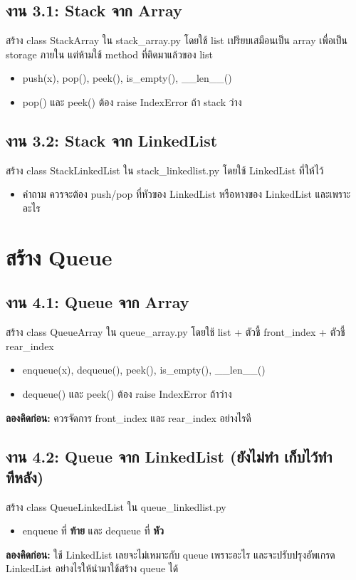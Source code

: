 \documentclass[12pt,a4paper]{article}
\begin{document}
	\subsection*{งาน 3.1: Stack จาก Array}
	สร้าง class {StackArray} ใน {stack\_array.py} โดยใช้ {list} เปรียบเสมือนเป็น array เพื่อเป็น storage ภายใน แต่ห้ามใช้ method ที่ติดมาแล้วของ list
	\begin{itemize}
		\item {push(x)}, {pop()}, {peek()}, {is\_empty()}, {\_\_len\_\_()}
		\item {pop()} และ {peek()} ต้อง raise {IndexError} ถ้า stack ว่าง
	\end{itemize}
	
	\subsection*{งาน 3.2: Stack จาก LinkedList}
	สร้าง class {StackLinkedList} ใน {stack\_linkedlist.py} โดยใช้ {LinkedList} ที่ให้ไว้
	\begin{itemize}
		\item คำถาม ควรจะต้อง push/pop ที่หัวของ LinkedList หรือหางของ LinkedList และเพราะอะไร
	\end{itemize}
	
	\section{สร้าง Queue}
	\subsection*{งาน 4.1: Queue จาก Array}
	สร้าง class {QueueArray} ใน {queue\_array.py} โดยใช้ {list} + ตัวชี้ {front\_index}
	+ ตัวชี้ {rear\_index}
	\begin{itemize}
		\item {enqueue(x)}, {dequeue()}, {peek()}, {is\_empty()}, {\_\_len\_\_()}
		\item {dequeue()} และ {peek()} ต้อง raise {IndexError} ถ้าว่าง
	\end{itemize}
	
	\textbf{ลองคิดก่อน:} ควรจัดการ {front\_index} และ {rear\_index} อย่างไรดี
	
	\subsection*{งาน 4.2: Queue จาก LinkedList (ยังไม่ทำ เก็บไว้ทำทีหลัง)}
	สร้าง class {QueueLinkedList} ใน {queue\_linkedlist.py}
	\begin{itemize}
		\item enqueue ที่ \textbf{ท้าย} และ dequeue ที่ \textbf{หัว} 
	\end{itemize}
	\textbf{ลองคิดก่อน:} ใช้ LinkedList เลยจะไม่เหมาะกับ queue เพราะอะไร และจะปรับปรุงอัพเกรด LinkedList อย่างไรให้นำมาใช้สร้าง queue ได้
	
\end{document}
